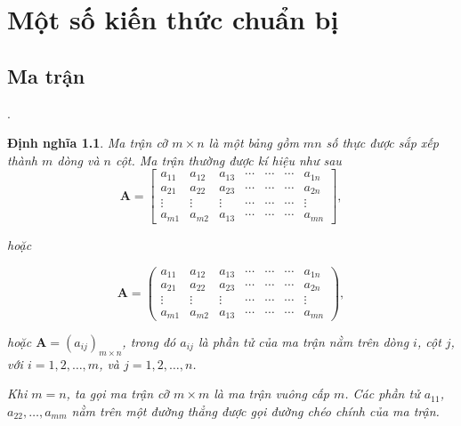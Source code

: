 \documentclass[12pt,a4paper,oneside]{report}
\newtheorem{dn}{Định nghĩa}[section]
\numberwithin{equation}{section}
\begin{document}
\chapter{Một số kiến thức chuẩn bị}
\section{Ma trận}.
\begin{dn}\rm                    %
 Ma trận cỡ $m \times n$ là một bảng gồm $m n$ số thực được sắp xếp thành $m$ dòng và $n$ cột. Ma trận thường được kí hiệu như sau\\
 $$
 \mathbf{A}=\left[\begin{array}{ccccccc}
 	a_{11} & a_{12} & a_{13} & \cdots & \cdots & \cdots & a_{1 n} \\
 	a_{21} & a_{22} & a_{23} & \cdots & \cdots & \cdots & a_{2 n} \\
 	\vdots & \vdots & \vdots & \cdots & \cdots & \cdots & \vdots \\
 	a_{m 1} & a_{m 2} & a_{13} & \cdots & \cdots & \cdots & a_{m n}
 \end{array}\right],
 $$
 
 hoặc
 
 $$
 \mathbf{A}=\left(\begin{array}{ccccccc}
 	a_{11} & a_{12} & a_{13} & \cdots & \cdots & \cdots & a_{1 n} \\
 	a_{21} & a_{22} & a_{23} & \cdots & \cdots & \cdots & a_{2 n} \\
 	\vdots & \vdots & \vdots & \cdots & \cdots & \cdots & \vdots \\
 	a_{m 1} & a_{m 2} & a_{13} & \cdots & \cdots & \cdots & a_{m n}
 \end{array}\right),
 $$
 
 hoặc $\mathbf{A}=\left(a_{i j}\right)_{m \times n}$, trong đó $a_{i j}$ là phần tử của ma trận nằm trên dòng $i$, cột $j$, với $i=1,2, \ldots, m$, và $j=1,2, \ldots, n$.
 
 Khi $m=n$, ta gọi ma trận cỡ $m \times m$ là ma trận vuông cấp $m$. Các phần tử $a_{11}$, $a_{22}, \ldots, a_{m m}$ nằm trên một đường thẳng được gọi đường chéo chính của ma trận.
\end{dn}
	
\end{document}
